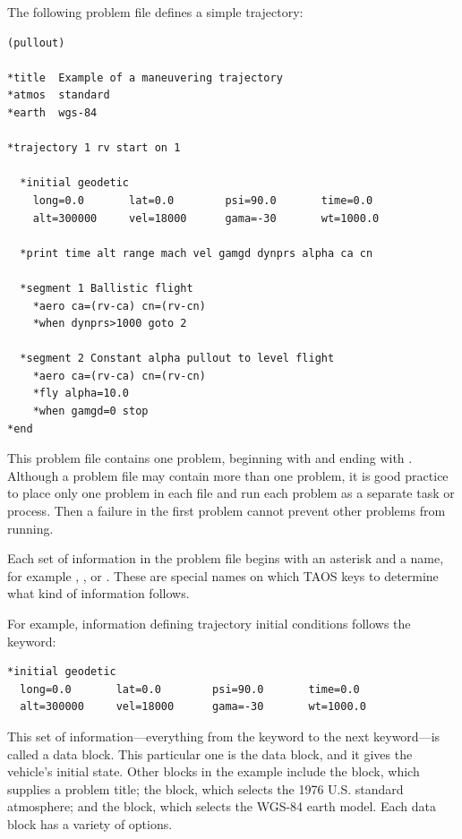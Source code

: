 The following problem file defines a simple trajectory:

\begin{lstlisting}[style=taosmanual]
(pullout)

*title  Example of a maneuvering trajectory
*atmos  standard
*earth  wgs-84

*trajectory 1 rv start on 1

  *initial geodetic
    long=0.0       lat=0.0        psi=90.0       time=0.0
    alt=300000     vel=18000      gama=-30       wt=1000.0

  *print time alt range mach vel gamgd dynprs alpha ca cn

  *segment 1 Ballistic flight
    *aero ca=(rv-ca) cn=(rv-cn)
    *when dynprs>1000 goto 2

  *segment 2 Constant alpha pullout to level flight
    *aero ca=(rv-ca) cn=(rv-cn)
    *fly alpha=10.0
    *when gamgd=0 stop
*end
\end{lstlisting}

This problem file contains one problem, beginning with  and ending
with . Although a problem file may contain more than one
problem, it is good practice to place only one problem in each file and run each
problem as a separate task or process. Then a failure in the first problem cannot
prevent other problems from running.


Each set of information in the problem file begins with an asterisk and a name, for
example , , or
. These are special names on which TAOS keys to
determine what kind of information follows.

For example, information defining trajectory initial conditions follows the
 keyword:

\begin{lstlisting}[style=taosmanual]
*initial geodetic
  long=0.0       lat=0.0        psi=90.0       time=0.0
  alt=300000     vel=18000      gama=-30       wt=1000.0
\end{lstlisting}

This set of information---everything from the  keyword to
the next  keyword---is called a data block. This particular one
is the  data block, and it gives the vehicle's initial state.
Other blocks in the example include the  block, which supplies
a problem title; the  block, which selects the 1976 U.S.
standard atmosphere; and the  block, which selects the WGS-84
earth model. Each data block has a variety of options.


